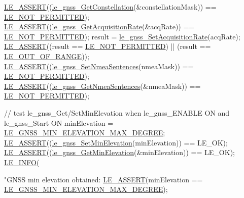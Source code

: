 \begin{DoxyCodeInclude}
{{{    \hyperlink{le__log_8h_ac0dbbef91dc0fed449d0092ff0557b39}{LE\_ASSERT}((\hyperlink{le__gnss__interface_8h_a150835481ab3751e3ab1821362e34e84}{le\_gnss\_GetConstellation}(&constellationMask)) == 
      \hyperlink{le__basics_8h_a1cca095ed6ebab24b57a636382a6c86cac6c0cac62213b786dabd7bf3e73bcec1}{LE\_NOT\_PERMITTED});
    \hyperlink{le__log_8h_ac0dbbef91dc0fed449d0092ff0557b39}{LE\_ASSERT}((\hyperlink{le__gnss__interface_8h_acfa9b25ac13f601921bd9123a1d0daba}{le\_gnss\_GetAcquisitionRate}(&acqRate)) == 
      \hyperlink{le__basics_8h_a1cca095ed6ebab24b57a636382a6c86cac6c0cac62213b786dabd7bf3e73bcec1}{LE\_NOT\_PERMITTED});
    result = \hyperlink{le__gnss__interface_8h_a75d96ec7ac6e0d6b58525e4c523d3b2c}{le\_gnss\_SetAcquisitionRate}(acqRate);
    \hyperlink{le__log_8h_ac0dbbef91dc0fed449d0092ff0557b39}{LE\_ASSERT}((result == \hyperlink{le__basics_8h_a1cca095ed6ebab24b57a636382a6c86cac6c0cac62213b786dabd7bf3e73bcec1}{LE\_NOT\_PERMITTED}) || (result == 
      \hyperlink{le__basics_8h_a1cca095ed6ebab24b57a636382a6c86caef8ecf11fa8556fd2d3ca8faab697717}{LE\_OUT\_OF\_RANGE}));
    \hyperlink{le__log_8h_ac0dbbef91dc0fed449d0092ff0557b39}{LE\_ASSERT}((\hyperlink{le__gnss__interface_8h_ab9253e29d74cae6e962dcc8b94f0e3c1}{le\_gnss\_SetNmeaSentences}(nmeaMask)) == 
      \hyperlink{le__basics_8h_a1cca095ed6ebab24b57a636382a6c86cac6c0cac62213b786dabd7bf3e73bcec1}{LE\_NOT\_PERMITTED});
    \hyperlink{le__log_8h_ac0dbbef91dc0fed449d0092ff0557b39}{LE\_ASSERT}((\hyperlink{le__gnss__interface_8h_a985845ac33d35c34ac3099b6557ca8ea}{le\_gnss\_GetNmeaSentences}(&nmeaMask)) == 
      \hyperlink{le__basics_8h_a1cca095ed6ebab24b57a636382a6c86cac6c0cac62213b786dabd7bf3e73bcec1}{LE\_NOT\_PERMITTED});

    \textcolor{comment}{// test le\_gnss\_Get/SetMinElevation when le\_gnss\_ENABLE ON and le\_gnss\_Start ON}
    minElevation = \hyperlink{le__gnss__interface_8h_a572e640b32639643c838350241f99b22}{LE\_GNSS\_MIN\_ELEVATION\_MAX\_DEGREE};
    \hyperlink{le__log_8h_ac0dbbef91dc0fed449d0092ff0557b39}{LE\_ASSERT}((\hyperlink{le__gnss__interface_8h_a78982eb8669530eef1bbc79ff79347e4}{le\_gnss\_SetMinElevation}(minElevation)) == LE\_OK);
    \hyperlink{le__log_8h_ac0dbbef91dc0fed449d0092ff0557b39}{LE\_ASSERT}((\hyperlink{le__gnss__interface_8h_ad8476e020a2eb0188703e78eed5818da}{le\_gnss\_GetMinElevation}(&minElevation)) == LE\_OK);
    \hyperlink{le__log_8h_a23e6d206faa64f612045d688cdde5808}{LE\_INFO}(\textcolor{stringliteral}{"GNSS min elevation obtained: %
    \hyperlink{le__log_8h_ac0dbbef91dc0fed449d0092ff0557b39}{LE\_ASSERT}(minElevation == \hyperlink{le__gnss__interface_8h_a572e640b32639643c838350241f99b22}{LE\_GNSS\_MIN\_ELEVATION\_MAX\_DEGREE});

}}}}
\end{DoxyCodeInclude}
